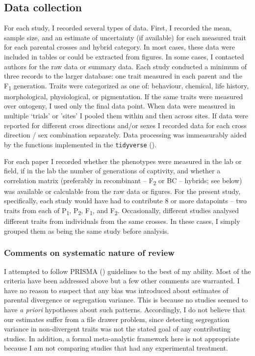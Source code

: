 \documentclass[times, twoside, watermark]{zHenriquesLab-StyleBioRxiv}
\begin{document}
\subsection{Data collection}
For each study, I recorded several types of data. First, I recorded the mean, sample size, and an estimate of uncertainty (if available) for each measured trait for each parental crosses and hybrid category. In most cases, these data were included in tables or could be extracted from figures. In some cases, I contacted authors for the raw data or summary data. Each study conducted a minimum of three records to the larger database: one trait measured in each parent and the F\textsubscript{1} generation. Traits were categorized as one of: behaviour, chemical, life history, morphological, physiological, or pigmentation. If the same traits were measured over ontogeny, I used only the final data point. When data were measured in multiple ‘trials’ or 'sites' I pooled them within and then across sites. If data were reported for different cross directions and/or sexes I recorded data for each cross direction / sex combination separately. Data processing was immeasurably aided by the functions implemented in the \texttt{tidyverse} (\citealt{Wickham2017}). \par

For each paper I recorded whether the phenotypes were measured in the lab or field, if in the lab the number of generations of captivity, and whether a correlation matrix (preferably in recombinant -- F\textsubscript{2} or BC -- hybrids; see below) was available or calculable from the raw data or figures. For the present study, specifically, each study would have had to contribute 8 or more datapoints -- two traits from each of P\textsubscript{1}, P\textsubscript{2}, F\textsubscript{1}, and F\textsubscript{2}. Occasionally, different studies analysed different traits from individuals from the same crosses. In these cases, I simply grouped them as being the same study before analysis. \par

\subsubsection{Comments on systematic nature of review}
I attempted to follow PRISMA (\citealt{Moher2009}) guidelines to the best of my ability. Most of the criteria have been addressed above but a few other comments are warranted. I have no reason to suspect that any bias was introduced about estimates of parental divergence or segregation variance. This is because no studies seemed to have \textit{a priori} hypotheses about such patterns. Accordingly, I do not believe that our estimates suffer from a file drawer problem, since detecting segregation variance in non-divergent traits was not the stated goal of any contributing studies. In addition, a formal meta-analytic framework here is not appropriate because I am not comparing studies that had any experimental treatment. 
\end{document}
